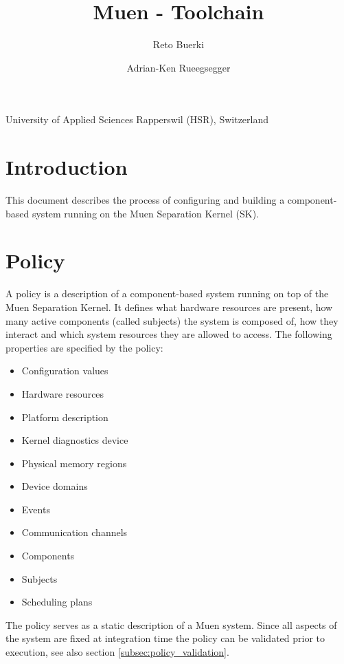 \documentclass[a4paper,twoside,titlepage]{article}
\title{Muen - Toolchain}
\author{Reto Buerki \and Adrian-Ken Rueegsegger}
\begin{document}


\maketitle

\begin{center}
	University of Applied Sciences Rapperswil (HSR), Switzerland
\end{center}
\clearpage

\tableofcontents
\listoffigures

\section{Introduction}
This document describes the process of configuring and building a
component-based system running on the Muen Separation Kernel (SK).

\section{Policy}
A policy is a description of a component-based system running on top of the Muen
Separation Kernel. It defines what hardware resources are present, how many
active components (called subjects) the system is composed of, how they interact
and which system resources they are allowed to access. The following properties
are specified by the policy:

\begin{itemize}
	\item Configuration values
	\item Hardware resources
	\item Platform description
	\item Kernel diagnostics device
	\item Physical memory regions
	\item Device domains
	\item Events
	\item Communication channels
	\item Components
	\item Subjects
	\item Scheduling plans
\end{itemize}

The policy serves as a static description of a Muen system. Since all aspects of
the system are fixed at integration time the policy can be validated prior to
execution, see also section \ref{subsec:policy_validation}.
\end{document}
